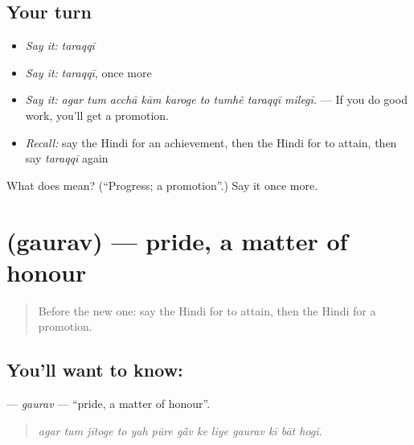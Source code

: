 \subsection*{Your turn}
\begin{itemize}
\raggedright
  \item \emph{Say it:} \emph{taraqqī}
  \item \emph{Say it:} \emph{taraqqī}, once more
  \item \emph{Say it:} \emph{agar tum acchā kām karoge to tumhẽ taraqqī milegī.} — If you do good work, you'll get a promotion.
  \item \emph{Recall:} say the Hindi for an achievement, then the Hindi for to attain, then say \emph{taraqqī} again
\end{itemize}

\begin{tcolorbox}[breakable,colback=teal!4,colframe=teal!35!black,title={Before you move on}]
What does  mean? (\textquotedblleft{}Progress; a promotion\textquotedblright{}.) Say it once more.
\end{tcolorbox}
\section[\texorpdfstring{\hi{गौरव} (gaurav)}{गौरव (gaurav)}]{ (gaurav) — pride, a matter of honour}

\label{lesson:HI-C393-gaurav}



\begin{quote}
Before the new one: say the Hindi for to attain, then the Hindi for a promotion.
\end{quote}

\subsection*{You'll want to know: }
\textbf{} — \emph{gaurav} — \textquotedblleft{}pride, a matter of honour\textquotedblright{}.

\begin{quote}
            
\end{quote}

\begin{quote}
\emph{agar tum jītoge to yah pūre gā̃v ke liye gaurav kī bāt hogī.}
\end{quote}

